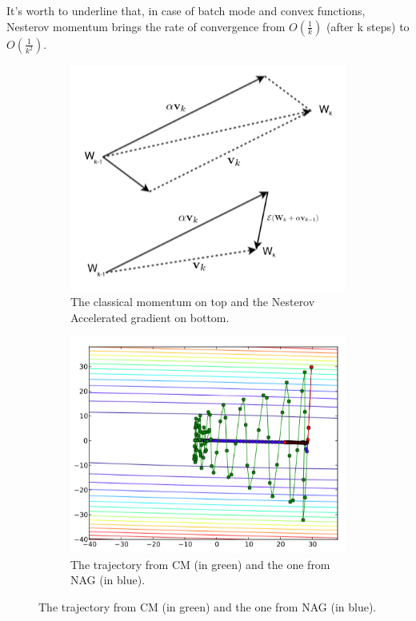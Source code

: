 			It's worth to underline that, in case of batch mode and convex functions, Nesterov momentum brings the rate of convergence from $O(\frac{1}{k})$ (after k steps) to $O(\frac{1}{k^2})$. %
			\begin{figure}
			\centering
				\begin{subfigure}[b]{0.4\textwidth}
					\includegraphics[width=\textwidth]{img/figures/momentum}
			  		\caption{The classical momentum on top and the Nesterov Accelerated gradient on bottom.}
				\label{fig:momentum}
				\end{subfigure}
				\qquad
				\begin{subfigure}[b]{0.4\textwidth}
					\includegraphics[width=\textwidth]{img/figures/momentum_graph}
				    \caption{The trajectory from CM (in green) and the one from NAG (in blue).}
				\label{fig:momentum_graph}
				\end{subfigure}
			\end{figure}


